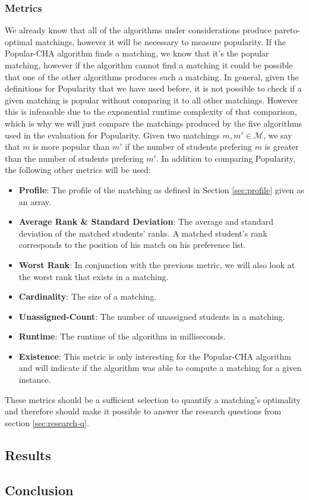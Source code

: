 \subsubsection{Metrics}
We already know that all of the algorithms under considerations produce pareto-optimal matchings, however it will be necessary to measure popularity. If the Popular-CHA algorithm finds a matching, we know that it's the popular matching, however if the algorithm cannot find a matching it could be possible that one of the other algorithms produces such a matching. In general, given the definitions for Popularity that we have used before, it is not possible to check if a given matching is popular without comparing it to all other matchings. However this is infeasable due to the exponential runtime complexity of that comparison, which is why we will just compare the matchings produced by the five algorithms used in the evaluation for Popularity. Given two matchings $m, m' \in \mathcal{M}$, we say that $m$ is more popular than $m'$ if the number of students prefering $m$ is greater than the number of students prefering $m'$. 
In addition to comparing Popularity, the following other metrics will be used:
\begin{itemize}
  \item \textbf{Profile}: The profile of the matching as defined in Section \ref{sec:profile} given as an array.
  \item \textbf{Average Rank \& Standard Deviation}: The average and standard deviation of the matched students' ranks. A matched student's rank corresponds to the position of his match on his preference list.
  \item \textbf{Worst Rank}: In conjunction with the previous metric, we will also look at the worst rank that exists in a matching.
  \item \textbf{Cardinality}: The size of a matching.
  \item \textbf{Unassigned-Count}: The number of unassigned students in a matching.
  \item \textbf{Runtime}: The runtime of the algorithm in milliseconds.
  \item \textbf{Existence}: This metric is only interesting for the Popular-CHA algorithm and will indicate if the algorithm was able to compute a matching for a given instance.
\end{itemize}

These metrics should be a sufficient selection to quantify a matching's optimality and therefore should make it possible to answer the research questions from section \ref{sec:research-q}.

\subsection{Results}

\subsection{Conclusion}